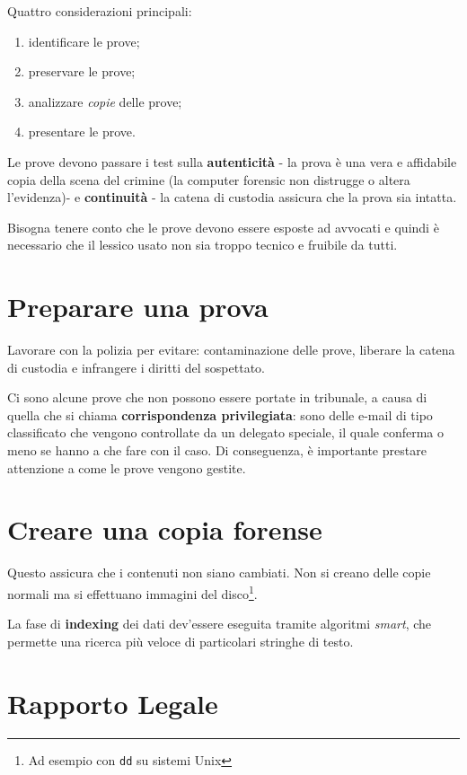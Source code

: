 Quattro considerazioni principali:

\begin{enumerate}
\item identificare le prove;
\item preservare le prove;
\item analizzare \emph{copie} delle prove;
\item presentare le prove.
\end{enumerate}

Le prove devono passare i test sulla \textbf{autenticità} - la prova è una vera
e affidabile copia della scena del crimine (la computer forensic non distrugge
o altera l'evidenza)- e \textbf{continuità} - la catena di custodia assicura
che la prova sia intatta.

Bisogna tenere conto che le prove devono essere esposte ad avvocati
e quindi è necessario che il lessico usato non sia troppo tecnico e fruibile da tutti.

\section{Preparare una prova}

Lavorare con la polizia per evitare: contaminazione delle prove, liberare la
catena di custodia e infrangere i diritti del sospettato.

Ci sono alcune prove che non possono essere portate in tribunale, a causa di
quella che si chiama \textbf{corrispondenza privilegiata}: sono delle e-mail
di tipo classificato che vengono controllate da un delegato speciale, il quale
conferma o meno se hanno a che fare con il caso. Di conseguenza, è importante
prestare attenzione a come le prove vengono gestite.

\section{Creare una copia forense}

Questo assicura che i contenuti non siano cambiati.
Non si creano delle copie normali ma si effettuano immagini del
disco\footnote{Ad esempio con \texttt{dd} su sistemi Unix}.

La fase di \textbf{indexing} dei dati dev'essere eseguita tramite algoritmi
\textit{smart}, che permette una ricerca più veloce di particolari stringhe di
testo.

\section{Rapporto Legale}

